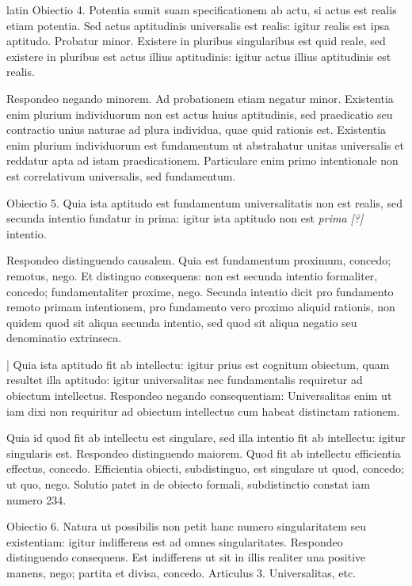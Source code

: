 \begin{otherlanguage*}{latin}
\pstart
Obiectio 4. Potentia sumit suam specificationem ab actu, si actus est realis etiam potentia. Sed actus aptitudinis universalis est realis:
igitur realis est ipsa aptitudo. Probatur minor. Existere in pluribus singularibus est quid reale, sed existere in pluribus est actus illius aptitudinis:
igitur actus illius aptitudinis est realis. 
\pend

\pstart
Respondeo negando minorem. Ad probationem etiam negatur minor. Existentia enim plurium individuorum non est actus huius aptitudinis, sed praedicatio seu contractio unius naturae ad plura individua, quae quid rationis est. Existentia enim plurium individuorum est fundamentum ut abstrahatur unitas universalis et reddatur apta ad istam praedicationem. Particulare enim primo intentionale non est correlativum universalis, sed fundamentum. 
\pend

\pstart
Obiectio 5. Quia ista aptitudo est fundamentum universalitatis non est realis, sed secunda intentio fundatur in prima:
igitur ista aptitudo non est \emph{prima [?]} intentio. 
\pend

\pstart
Respondeo distinguendo causalem. Quia est fundamentum proximum, concedo; remotus, nego. Et distinguo consequens:
non est secunda intentio formaliter, concedo; fundamentaliter proxime, nego. Secunda intentio dicit pro fundamento remoto primam intentionem, pro fundamento vero proximo aliquid rationis, non quidem quod sit aliqua secunda intentio, sed quod sit aliqua negatio seu denominatio extrinseca. 
\pend

\pstart
\textnormal{|} Quia ista aptitudo fit ab intellectu:
igitur prius est  cognitum obiectum, quam resultet illa aptitudo:
igitur universalitas nec fundamentalis requiretur ad obiectum intellectus. Respondeo negando consequentiam:
Universalitas enim ut iam dixi non requiritur ad obiectum intellectus cum habeat distinctam rationem. 
\pend

\pstart
Quia id quod fit ab intellectu est singulare, sed illa intentio fit ab intellectu:
igitur singularis est. Respondeo distinguendo maiorem. Quod fit ab intellectu efficientia effectus, concedo. Efficientia obiecti, subdistinguo, est singulare ut quod, concedo; ut quo, nego. Solutio patet in  de obiecto formali, subdistinctio constat iam numero 234. 
\pend

\pstart
Obiectio 6. Natura ut possibilis non petit hanc numero singularitatem seu existentiam:
igitur indifferens est ad omnes singularitates. Respondeo distinguendo consequens. Est indifferens ut sit in illis realiter una positive manens, nego; partita et divisa, concedo. Articulus 3. Universalitas, etc. 
\pend


\end{otherlanguage*}
